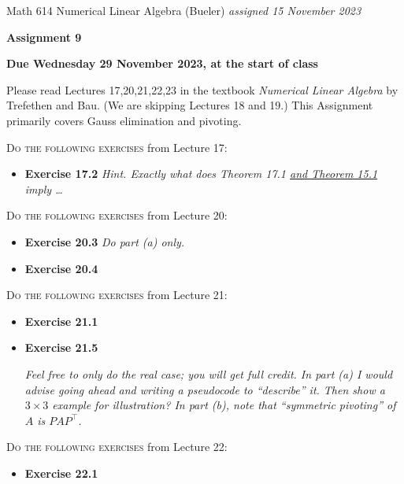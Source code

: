 \documentclass[12pt]{amsart}
\begin{document}
\scriptsize \noindent Math 614 Numerical Linear Algebra (Bueler) \hfill \emph{assigned 15 November 2023}
\normalsize\medskip

\Large\centerline{\textbf{Assignment 9}}
\large
\medskip

\centerline{\textbf{Due Wednesday 29 November 2023, at the start of class}}
\medskip
\normalsize

\thispagestyle{empty}

\bigskip
\noindent Please read Lectures 17,20,21,22,23 in the textbook \emph{Numerical Linear Algebra} by Trefethen and Bau.  (We are skipping Lectures 18 and 19.)  This Assignment primarily covers Gauss elimination and pivoting.

\bigskip
\noindent \textsc{Do the following exercises} from Lecture 17:

\begin{itemize}
\item \textbf{Exercise 17.2} \quad \emph{Hint.  Exactly what does Theorem 17.1 \underline{and Theorem  15.1} imply \dots}
\end{itemize}

\bigskip
\noindent \textsc{Do the following exercises} from Lecture 20:

\begin{itemize}
\item \textbf{Exercise 20.3} \quad \emph{Do part \emph{(a)} only.}
\item \textbf{Exercise 20.4}
\end{itemize}

\bigskip
\noindent \textsc{Do the following exercises} from Lecture 21:

\begin{itemize}
\item \textbf{Exercise 21.1}
\item \textbf{Exercise 21.5}  \qquad \begin{minipage}[t]{0.68\textwidth}  \emph{Feel free to only do the real case; you will get full credit.  In part \emph{(a)} I would advise going ahead and writing a pseudocode to ``describe'' it.  Then show a $3\times 3$ example for illustration?  In part \emph{(b)}, note that ``symmetric pivoting'' of $A$ is $PAP^\top$.}
\end{minipage}
\end{itemize}

\bigskip
\noindent \textsc{Do the following exercises} from Lecture 22:

\begin{itemize}
\item \textbf{Exercise 22.1}
\end{itemize}
\end{document}
